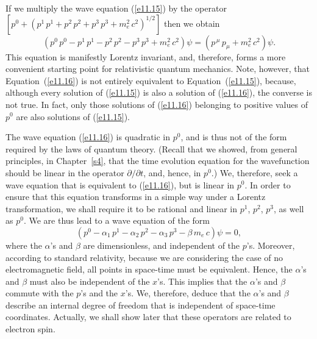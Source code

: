 If we multiply the wave equation (\ref{e11.15}) by the operator $\left[p^0  +(p^1\,p^1+p^2\,p^2+p^3\,p^3+m_e^2\,c^2)^{1/2}\right]$
then we obtain
\begin{equation}\label{e11.16}
\left(p^0\,p^0- p^1\,p^1-p^2\,p^2-p^3\,p^3+m_e^2\,c^2\right)\psi = \left(p^{\,\mu}\,p_\mu+m_e^2\,c^2\right)\psi.
\end{equation}
This equation is manifestly Lorentz invariant, and, therefore, forms a more convenient starting point for relativistic quantum mechanics. 
Note, however, that Equation~(\ref{e11.16}) is not entirely equivalent to Equation~(\ref{e11.15}), because, although every
solution of (\ref{e11.15}) is also a solution of (\ref{e11.16}), the converse is not true. In fact, only those solutions of (\ref{e11.16})
belonging to positive values of $p^0$ are also solutions of (\ref{e11.15}). 

The wave equation (\ref{e11.16}) is quadratic in $p^0$, and is thus not of the form required by the  laws of quantum theory.  (Recall that we showed, from
general principles, in Chapter~\ref{s4},   that the 
time evolution equation for the wavefunction should be linear in the operator $\partial/\partial t$, and, hence, in $p^0$.) We, therefore, seek a wave equation that is
equivalent to (\ref{e11.16}), but is
linear in $p^0$. In order to ensure that this equation transforms in a simple way under a Lorentz transformation, we
shall require it to be rational and linear in $p^1$, $p^2$, $p^3$, as well as $p^0$. We are thus
lead to a wave equation of the form
\begin{equation}\label{e11.17}
\left(p^0 - \alpha_1\,p^1-\alpha_2\,p^2-\alpha_3\,p^3-\beta\,m_e\,c\right)\psi = 0,
\end{equation}
where the $\alpha$'s and $\beta$ are dimensionless, and independent of the $p$'s. Moreover, according to standard relativity, because we are considering the case of no electromagnetic field, all points in space-time
must be equivalent. Hence, the $\alpha$'s and $\beta$ must also be independent of
the $x$'s. This implies that the $\alpha$'s and $\beta$ commute with the $p$'s and the $x$'s. We, therefore,  deduce that the $\alpha$'s and $\beta$
describe an internal degree of freedom that is independent of space-time coordinates. Actually, we shall show later that these operators are related to electron spin. 

